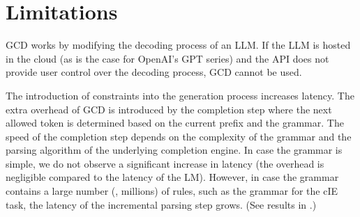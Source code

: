 
\section*{Limitations}\label{sec:limitations}
GCD works by modifying the decoding process of an LLM.
If the LLM is hosted in the cloud (as is the case for OpenAI's GPT series) and the API does not provide user control over the decoding process, GCD cannot be used.

The introduction of constraints into the generation process increases latency.
The extra overhead of GCD is introduced by the completion step where the next allowed token is determined based on the current prefix and the grammar.
The speed of the completion step depends on the complexity of the grammar and the parsing algorithm of the underlying completion engine.
In case the grammar is simple, we do not observe a significant increase in latency (the overhead is negligible compared to the latency of the LM).
However, in case the grammar contains a large number (\eg, millions) of rules, such as the grammar for the cIE task, the latency of the incremental parsing step grows.
(See results in .)